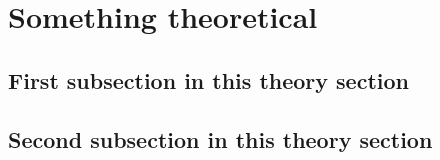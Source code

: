 \newpage\clearpage

\section{Something theoretical}%
\label{appendix:extra-theory}

\subsection*{First subsection in this theory section}
\lipsum[1]


\subsection*{Second subsection in this theory section}
\lipsum[5]


\newpage\clearpage
